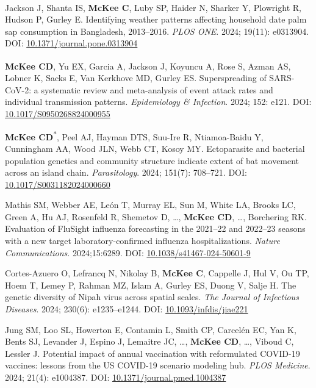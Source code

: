 \documentclass{cv}
\begin{document}
\begin{pubenum}
\item Jackson J\textsuperscript{\ddag}, Shanta IS, \textbf{McKee C}, Luby SP, Haider N, Sharker Y, Plowright R, Hudson P, Gurley E. Identifying weather patterns affecting household date palm sap consumption in Bangladesh, 2013--2016. \textit{PLOS ONE}. 2024; 19(11): e0313904. DOI: \href{https://doi.org/10.1371/journal.pone.0313904}{10.1371/journal.pone.0313904}

\item \textbf{McKee CD}, Yu EX, Garcia A\textsuperscript{\ddag}, Jackson J\textsuperscript{\ddag}, Koyuncu A, Rose S, Azman AS, Lobner K, Sacks E, Van Kerkhove MD, Gurley ES. Superspreading of SARS-CoV-2: a systematic review and meta-analysis of event attack rates and individual transmission patterns. \textit{Epidemiology \& Infection}. 2024; 152: e121. DOI: \href{https://doi.org/10.1017/S0950268824000955}{10.1017/S0950268824000955}

\item \textbf{McKee CD}\textsuperscript{*}, Peel AJ, Hayman DTS, Suu-Ire R, Ntiamoa-Baidu Y, Cunningham AA, Wood JLN, Webb CT, Kosoy MY. Ectoparasite and bacterial population genetics and community structure indicate extent of bat movement across an island chain. \textit{Parasitology}. 2024; 151(7): 708--721. DOI: \href{https://doi.org/10.1017/S0031182024000660}{10.1017/S0031182024000660}

\item Mathis SM, Webber AE, León T, Murray EL, Sun M, White LA, Brooks LC, Green A, Hu AJ, Rosenfeld R, Shemetov D, …, \textbf{McKee CD}, …, Borchering RK. Evaluation of FluSight influenza forecasting in the 2021--22 and 2022--23 seasons with a new target laboratory-confirmed influenza hospitalizations. \textit{Nature Communications}. 2024;15:6289. DOI: \href{https://doi.org/10.1038/s41467-024-50601-9}{10.1038/s41467-024-50601-9}

\item Cortes-Azuero O, Lefrancq N, Nikolay B, \textbf{McKee C}, Cappelle J, Hul V, Ou TP, Hoem T, Lemey P, Rahman MZ, Islam A, Gurley ES, Duong V, Salje H. The genetic diversity of Nipah virus across spatial scales. \textit{The Journal of Infectious Diseases}. 2024; 230(6): e1235--e1244. DOI: \href{https://doi.org/10.1093/infdis/jiae221}{10.1093/infdis/jiae221}

\item Jung SM, Loo SL, Howerton E, Contamin L, Smith CP, Carcelén EC, Yan K, Bents SJ, Levander J, Espino J, Lemaitre JC, …, \textbf{McKee CD}, …, Viboud C, Lessler J. Potential impact of annual vaccination with reformulated COVID-19 vaccines: lessons from the US COVID-19 scenario modeling hub. \textit{PLOS Medicine}. 2024; 21(4): e1004387. DOI: \href{https://doi.org/10.1371/journal.pmed.1004387}{10.1371/journal.pmed.1004387}


\end{pubenum}
\end{document}
